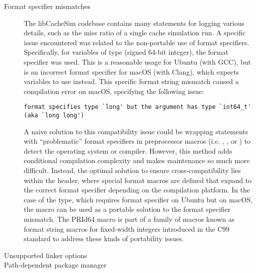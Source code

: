 \begin{description}
    \item[Format specifier mismatches] 
    
    The libCacheSim codebase contains many  statements for logging various details, such as the miss ratio of a single cache simulation run. A specific issue encountered was related to the non-portable use of format specifiers. Specifically, for variables of type  (signed 64-bit integer), the  format specifier was used. This is a reasonable usage for Ubuntu (with GCC), but is an incorrect format specifier for macOS (with Clang), which expects  variables to use  instead. This specific format string mismatch caused a compilation error on macOS, specifying the following issue:

    \lstset{style=compilation_error}
    
    \begin{lstlisting}
format specifies type `long' but the argument has type `int64_t' (aka `long long')
    \end{lstlisting}

    A naive solution to this compatibility issue could be wrapping  statements with \enquote{problematic} format specifiers in preprocessor macros (i.e. , , or ) to detect the operating system or compiler. However, this method adds conditional compilation complexity and makes maintenance so much more difficult. Instead, the optimal solution to ensure cross-compatibility lies within the  header, where special format macros are defined that expand to the correct format specifier depending on the compilation platform. In the case of the  type, which requires format specifier  on Ubuntu but  on macOS, the  macro can be used as a portable solution to the format specifier mismatch. The PRId64 macro is part of a family of macros known as format string macros for fixed-width integers introduced in the C99 standard \cite{cppreference_inttypes} to address these kinds of portability issues.
    

    \item[Unsupported linker options]


    
    \item[Path-dependent package manager]
\end{description}



